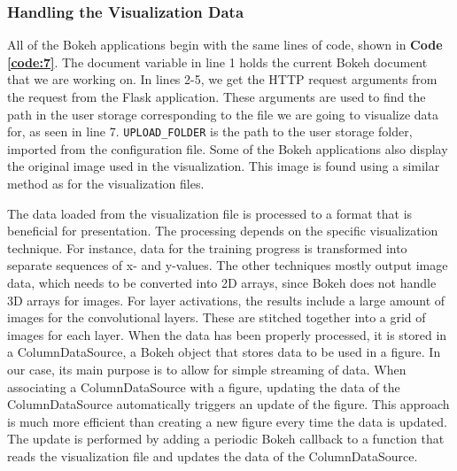\subsubsection{Handling the Visualization Data}

All of the Bokeh applications begin with the same lines of code, shown in \textbf{Code \ref{code:7}}. The document variable in line 1 holds the current Bokeh document that we are working on. In lines 2-5, we get the HTTP request arguments from the request from the Flask application. These arguments are used to find the path in the user storage corresponding to the file we are going to visualize data for, as seen in line 7. \texttt{UPLOAD\_FOLDER} is the path to the user storage folder, imported from the configuration file. Some of the Bokeh applications also display the original image used in the visualization. This image is found using a similar method as for the visualization files. \\


\noindent The data loaded from the visualization file is processed to a format that is beneficial for presentation. The processing depends on the specific visualization technique. For instance, data for the training progress is transformed into separate sequences of x- and y-values. The other techniques mostly output image data, which needs to be converted into 2D arrays, since Bokeh does not handle 3D arrays for images. For layer activations, the results include a large amount of images for the convolutional layers. These are stitched together into a grid of images for each layer. When the data has been properly processed, it is stored in a ColumnDataSource, a Bokeh object that stores data to be used in a figure. In our case, its main purpose is to allow for simple streaming of data. When associating a ColumnDataSource with a figure, updating the data of the ColumnDataSource automatically triggers an update of the figure. This approach is much more efficient than creating a new figure every time the data is updated. The update is performed by adding a periodic Bokeh callback to a function that reads the visualization file and updates the data of the ColumnDataSource.

